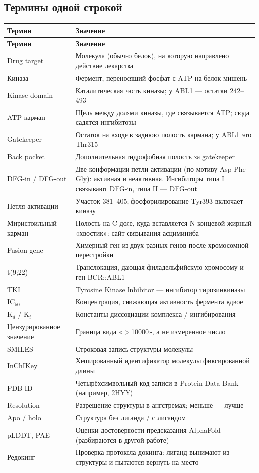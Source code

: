 \documentclass[11pt,a4paper]{article}
\begin{document}
\subsection{Термины одной строкой}

\begin{center}
\small
\begin{longtable}{L{3.7cm}L{10.9cm}}
\toprule
\textbf{Термин} & \textbf{Значение} \\
\midrule
\endfirsthead
\toprule
\textbf{Термин} & \textbf{Значение} \\
\midrule
\endhead
Drug target & Молекула (обычно белок), на которую направлено действие лекарства \\
Киназа & Фермент, переносящий фосфат с ATP на белок-мишень \\
Kinase domain & Каталитическая часть киназы; у ABL1 --- остатки 242--493 \\
ATP-карман & Щель между долями киназы, где связывается ATP; сюда садятся ингибиторы \\
Gatekeeper & Остаток на входе в заднюю полость кармана; у ABL1 это Thr315 \\
Back pocket & Дополнительная гидрофобная полость за gatekeeper \\
DFG-in / DFG-out & Две конформации петли активации (по мотиву Asp-Phe-Gly): активная и неактивная. Ингибиторы типа I связывают DFG-in, типа II --- DFG-out \\
Петля активации & Участок 381--405; фосфорилирование Tyr393 включает киназу \\
Миристоильный карман & Полость на C-доле, куда вставляется N-концевой жирный «хвостик»; сайт связывания асциминиба \\
Fusion gene & Химерный ген из двух разных генов после хромосомной перестройки \\
t(9;22) & Транслокация, дающая филадельфийскую хромосому и ген BCR::ABL1 \\
TKI & Tyrosine Kinase Inhibitor --- ингибитор тирозинкиназы \\
IC$_{50}$ & Концентрация, снижающая активность фермента вдвое \\
K$_d$ / K$_i$ & Константы диссоциации комплекса / ингибирования \\
Цензурированное значение & Граница вида «$>$10000», а не измеренное число \\
SMILES & Строковая запись структуры молекулы \\
InChIKey & Хешированный идентификатор молекулы фиксированной длины \\
PDB ID & Четырёхсимвольный код записи в Protein Data Bank (например, 2HYY) \\
Resolution & Разрешение структуры в ангстремах; меньше --- лучше \\
Apo / holo & Структура без лиганда / с лигандом \\
pLDDT, PAE & Оценки достоверности предсказания AlphaFold (разбираются в другой работе) \\
Редокинг & Проверка протокола докинга: лиганд вынимают из структуры и пытаются вернуть на место \\
\bottomrule
\end{longtable}
\end{center}
\end{document}
